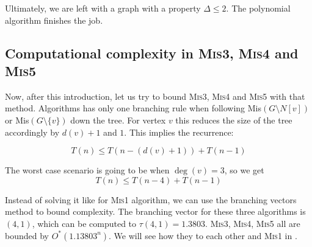 Ultimately, we are left with a graph with a property $\Delta \leq 2$. The polynomial algorithm \cite{alg:poly} finishes the job.

\subsection{Computational complexity in \textsc{Mis3}, \textsc{Mis4} and \textsc{Mis5}}

Now, after this introduction, let us try to bound \textsc{Mis3}, \textsc{Mis4} and \textsc{Mis5} with that method. Algorithms has only one branching rule when following Mis$(G\setminus N[v])$ or Mis$(G\setminus \{v\})$ down the tree. For vertex $v$ this reduces the size of the tree accordingly by $d(v) + 1$ and $1$. This implies the recurrence:

$$
T(n) \leq T(n-(d(v)+1)) + T(n - 1)
$$

The worst case scenario is going to be when $\deg(v)=3$, so we get
$$
T(n) \leq T(n - 4) + T(n - 1)
$$

Instead of solving it like for \textsc{Mis1} algorithm, we can use the branching vectors method to bound complexity. The branching vector for these three algorithms is $(4,1)$, which can be computed to $\tau(4,1)=1.3803$. \textsc{Mis3}, \textsc{Mis4}, \textsc{Mis5} all are bounded by $O^*(1.13803^n)$. We will see how they to each other and \textsc{Mis1} in .
